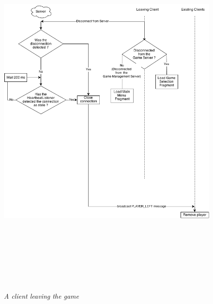 \begin{figure}
\includegraphics[height=7.665in,width=6.23in]{./images/diagrams/player_disconnected.png}
\caption{\small \sl A client leaving the game
\label{fig:player_disconnected}}
\end{figure}

